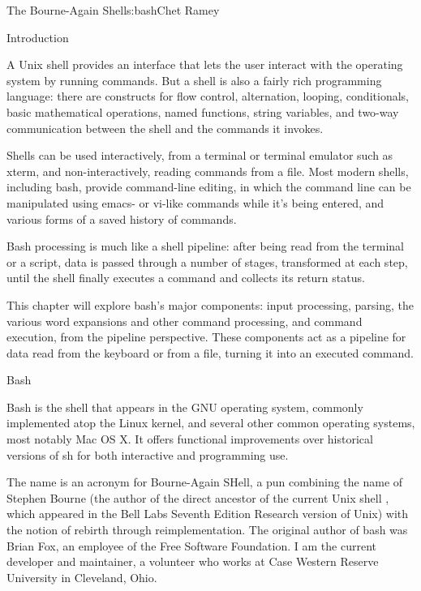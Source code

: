 \begin{aosachapter}{The Bourne-Again Shell}{s:bash}{Chet Ramey}

\begin{aosasect1}{Introduction}

A Unix shell provides an interface that lets the user interact
with the operating system by running commands.
But a shell is also a fairly rich
programming language: there are constructs for flow control,
alternation, looping, conditionals, basic mathematical operations,
named functions, string variables, and two-way communication between
the shell and the commands it invokes.

Shells can be used interactively, from a terminal or terminal emulator
such as xterm, and non-interactively, reading commands from a file.
Most modern shells, including bash, provide command-line editing, in
which the command line can be manipulated using emacs- or vi-like
commands while it's being entered, and various forms of a saved
history of commands.

Bash processing is much like a shell pipeline: after being read from
the terminal or a script, data is passed through a number of stages,
transformed at each step, until the shell finally executes a command
and collects its return status.

This chapter will explore bash's major components: input processing,
parsing, the various word expansions and other command processing, and
command execution, from the pipeline perspective.  These components
act as a pipeline for data read from the keyboard or from a file,
turning it into an executed command.


\begin{aosasect2}{Bash}

Bash is the shell that appears in the GNU operating system, commonly
implemented atop the Linux kernel, and several other common operating
systems, most notably Mac OS X\@.  It offers functional improvements
over historical versions of sh for both interactive and programming
use.

The name is an acronym for Bourne-Again SHell, a pun combining the
name of Stephen Bourne (the author of the direct ancestor of the
current Unix shell , which appeared in the Bell Labs
Seventh Edition Research version of Unix) with the notion of rebirth
through reimplementation.
The original author of bash was Brian Fox, an employee of the Free
Software Foundation.  I am the current developer and maintainer, a
volunteer who works at Case Western Reserve University in Cleveland,
Ohio.


\end{aosasect2}
\end{aosasect1}
\end{aosachapter}
